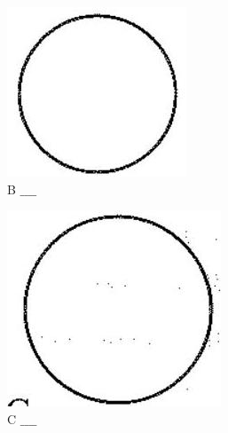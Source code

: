 \documentclass[10pt]{article}
\begin{document}
\begin{figure}[h]
\begin{center}
  \includegraphics[width=\textwidth]{2025_10_23_76620c17ffac1ae9b35bg-54(3)}
\captionsetup{labelformat=empty}
\caption{B $\_\_\_\_$}
\end{center}
\end{figure}

\begin{figure}[h]
\begin{center}
  \includegraphics[width=\textwidth]{2025_10_23_76620c17ffac1ae9b35bg-54(2)}
\captionsetup{labelformat=empty}
\caption{C $\_\_\_\_$}
\end{center}
\end{figure}
\end{document}
